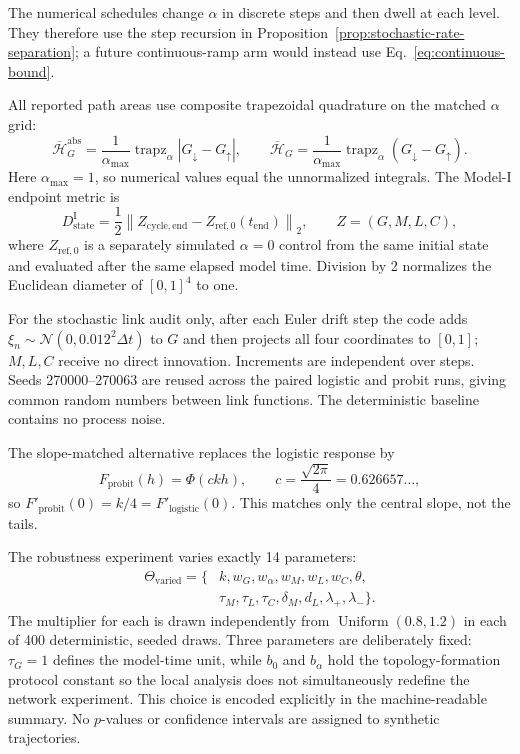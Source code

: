 \documentclass[pdflatex,sn-mathphys-num]{sn-jnl}
\begin{document}
The numerical schedules change $\alpha$ in discrete steps and then dwell at each level. They therefore use the step recursion in Proposition~\ref{prop:stochastic-rate-separation}; a future continuous-ramp arm would instead use Eq.~\eqref{eq:continuous-bound}.

All reported path areas use composite trapezoidal quadrature on the matched $\alpha$ grid:
\begin{equation}
\overline{\mathcal H}^{\mathrm{abs}}_G
=\frac{1}{\alpha_{\max}}\operatorname{trapz}_{\alpha}|G_\downarrow-G_\uparrow|,
\qquad
\overline{\mathcal H}_G
=\frac{1}{\alpha_{\max}}\operatorname{trapz}_{\alpha}(G_\downarrow-G_\uparrow).
\label{eq:numerical-area}
\end{equation}
Here $\alpha_{\max}=1$, so numerical values equal the unnormalized integrals. The Model-I endpoint metric is
\begin{equation}
D_{\mathrm{state}}^{\mathrm I}
=\frac12\left\|Z_{\mathrm{cycle,end}}-Z_{\mathrm{ref},0}(t_{\mathrm{end}})\right\|_2,
\qquad Z=(G,M,L,C),
\label{eq:model-i-state-deficit}
\end{equation}
where $Z_{\mathrm{ref},0}$ is a separately simulated $\alpha=0$ control from the same initial state and evaluated after the same elapsed model time. Division by 2 normalizes the Euclidean diameter of $[0,1]^4$ to one.

For the stochastic link audit only, after each Euler drift step the code adds $\xi_n\sim\mathcal N(0,0.012^2\Delta t)$ to $G$ and then projects all four coordinates to $[0,1]$; $M,L,C$ receive no direct innovation. Increments are independent over steps. Seeds 270000--270063 are reused across the paired logistic and probit runs, giving common random numbers between link functions. The deterministic baseline contains no process noise.

The slope-matched alternative replaces the logistic response by
\begin{equation}
F_{\mathrm{probit}}(h)=\Phi(c k h),
\qquad c=\frac{\sqrt{2\pi}}{4}=0.626657\ldots,
\end{equation}
so $F'_{\mathrm{probit}}(0)=k/4=F'_{\mathrm{logistic}}(0)$. This matches only the central slope, not the tails.

The robustness experiment varies exactly 14 parameters:
\begin{equation}
\begin{aligned}
\Theta_{\mathrm{varied}}=\{&k,w_G,w_\alpha,w_M,w_L,w_C,\theta,\\
&\tau_M,\tau_L,\tau_C,\delta_M,d_L,\lambda_+,\lambda_-\}.
\end{aligned}
\end{equation}
The multiplier for each is drawn independently from $\operatorname{Uniform}(0.8,1.2)$ in each of 400 deterministic, seeded draws. Three parameters are deliberately fixed: $\tau_G=1$ defines the model-time unit, while $b_0$ and $b_\alpha$ hold the topology-formation protocol constant so the local analysis does not simultaneously redefine the network experiment. This choice is encoded explicitly in the machine-readable summary. No $p$-values or confidence intervals are assigned to synthetic trajectories.
\end{document}
